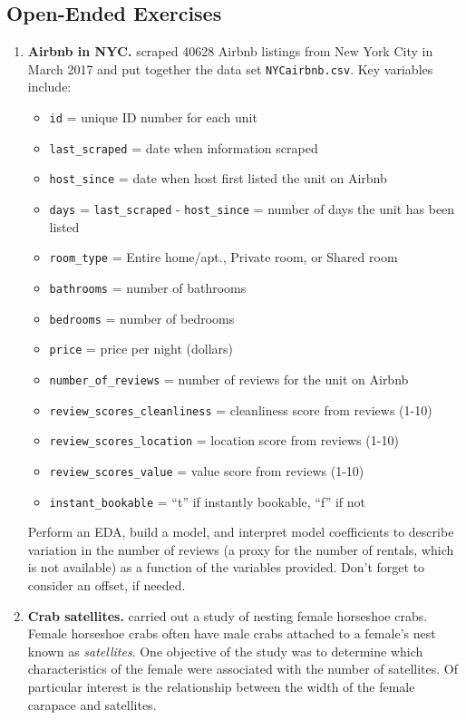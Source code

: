 \documentclass[
]{krantz}
\providecommand{\tightlist}{%
  \setlength{\itemsep}{0pt}\setlength{\parskip}{0pt}}
\begin{document}
\hypertarget{open-ended-exercises-2}{%
\subsection{Open-Ended Exercises}\label{open-ended-exercises-2}}

\begin{enumerate}
\def\labelenumi{\arabic{enumi}.}
\item
  \textbf{Airbnb in NYC.} \citet{Awad2017} scraped 40628 Airbnb listings from New York City in March 2017 and put together the data set \texttt{NYCairbnb.csv}. Key variables include:

  \begin{itemize}
  \tightlist
  \item
    \texttt{id} = unique ID number for each unit
  \item
    \texttt{last\_scraped} = date when information scraped
  \item
    \texttt{host\_since} = date when host first listed the unit on Airbnb
  \item
    \texttt{days} = \texttt{last\_scraped} - \texttt{host\_since} = number of days the unit has been listed
  \item
    \texttt{room\_type} = Entire home/apt., Private room, or Shared room
  \item
    \texttt{bathrooms} = number of bathrooms
  \item
    \texttt{bedrooms} = number of bedrooms
  \item
    \texttt{price} = price per night (dollars)
  \item
    \texttt{number\_of\_reviews} = number of reviews for the unit on Airbnb
  \item
    \texttt{review\_scores\_cleanliness} = cleanliness score from reviews (1-10)
  \item
    \texttt{review\_scores\_location} = location score from reviews (1-10)
  \item
    \texttt{review\_scores\_value} = value score from reviews (1-10)
  \item
    \texttt{instant\_bookable} = ``t'' if instantly bookable, ``f'' if not
  \end{itemize}

  Perform an EDA, build a model, and interpret model coefficients to describe variation in the number of reviews (a proxy for the number of rentals, which is not available) as a function of the variables provided. Don't forget to consider an offset, if needed.
\item
  \textbf{Crab satellites.} \citet{Brockmann1996} carried out a study of nesting female horseshoe crabs. Female horseshoe crabs often have male crabs attached to a female's nest known as \emph{satellites}. One objective of the study was to determine which characteristics of the female were associated with the number of satellites. Of particular interest is the relationship between the width of the female carapace and satellites.


\end{enumerate}
\end{document}
